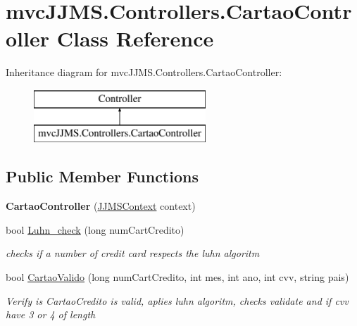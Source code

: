 \hypertarget{classmvc_j_j_m_s_1_1_controllers_1_1_cartao_controller}{}\section{mvc\+J\+J\+M\+S.\+Controllers.\+Cartao\+Controller Class Reference}
\label{classmvc_j_j_m_s_1_1_controllers_1_1_cartao_controller}
Inheritance diagram for mvc\+J\+J\+M\+S.\+Controllers.\+Cartao\+Controller\+:\begin{figure}[H]
\begin{center}
\leavevmode
\includegraphics[height=2.000000cm]{classmvc_j_j_m_s_1_1_controllers_1_1_cartao_controller}
\end{center}
\end{figure}
\subsection*{Public Member Functions}
\begin{DoxyCompactItemize}
\item 
\mbox{\label{classmvc_j_j_m_s_1_1_controllers_1_1_cartao_controller_acd5089f69da95c88587b994307362ade}} 
{\bfseries Cartao\+Controller} (\mbox{\hyperlink{classmvc_j_j_m_s_1_1_data_1_1_j_j_m_s_context}{J\+J\+M\+S\+Context}} context)
\item 
bool \mbox{\hyperlink{classmvc_j_j_m_s_1_1_controllers_1_1_cartao_controller_a1e60f8ebecc93f7210c7e8a143c2e965}{Luhn\+\_\+check}} (long num\+Cart\+Credito)
\begin{DoxyCompactList}\small\item\em checks if a number of credit card respects the luhn algoritm \end{DoxyCompactList}\item 
bool \mbox{\hyperlink{classmvc_j_j_m_s_1_1_controllers_1_1_cartao_controller_a1e57d6690edbfa272d61c72e3e2f945b}{Cartao\+Valido}} (long num\+Cart\+Credito, int mes, int ano, int cvv, string pais)
\begin{DoxyCompactList}\small\item\em Verify is Cartao\+Credito is valid, aplies luhn algoritm, checks validate and if cvv have 3 or 4 of length \end{DoxyCompactList}\end{DoxyCompactItemize}


